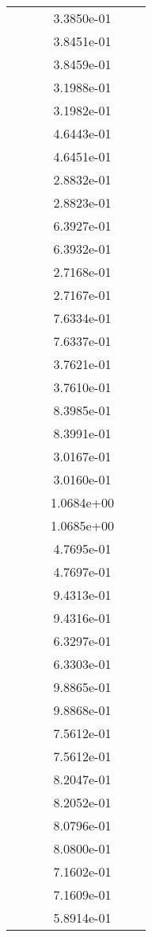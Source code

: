 \begin{xltabular}{\textwidth}{r|rS[table-format=1.3e+2]S[table-format=1.4e+2]S[table-format=1.4e+2]S[table-format=-1.5]}
&  &  & 3.3850e-01 & & \\
&  &  & 3.8451e-01 & & \\
&  &  & 3.8459e-01 & & \\
&  &  & 3.1988e-01 & & \\
&  &  & 3.1982e-01 & & \\
&  &  & 4.6443e-01 & & \\
&  &  & 4.6451e-01 & & \\
&  &  & 2.8832e-01 & & \\
&  &  & 2.8823e-01 & & \\
&  &  & 6.3927e-01 & & \\
&  &  & 6.3932e-01 & & \\
&  &  & 2.7168e-01 & & \\
&  &  & 2.7167e-01 & & \\
&  &  & 7.6334e-01 & & \\
&  &  & 7.6337e-01 & & \\
&  &  & 3.7621e-01 & & \\
&  &  & 3.7610e-01 & & \\
&  &  & 8.3985e-01 & & \\
&  &  & 8.3991e-01 & & \\
&  &  & 3.0167e-01 & & \\
&  &  & 3.0160e-01 & & \\
&  &  & 1.0684e+00 & & \\
&  &  & 1.0685e+00 & & \\
&  &  & 4.7695e-01 & & \\
&  &  & 4.7697e-01 & & \\
&  &  & 9.4313e-01 & & \\
&  &  & 9.4316e-01 & & \\
&  &  & 6.3297e-01 & & \\
&  &  & 6.3303e-01 & & \\
&  &  & 9.8865e-01 & & \\
&  &  & 9.8868e-01 & & \\
&  &  & 7.5612e-01 & & \\
&  &  & 7.5612e-01 & & \\
&  &  & 8.2047e-01 & & \\
&  &  & 8.2052e-01 & & \\
&  &  & 8.0796e-01 & & \\
&  &  & 8.0800e-01 & & \\
&  &  & 7.1602e-01 & & \\
&  &  & 7.1609e-01 & & \\
&  &  & 5.8914e-01 & & \\

\end{xltabular}
